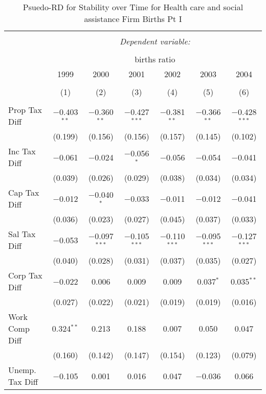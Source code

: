 
\begin{table}[!htbp] \centering 
  \caption{Psuedo-RD for Stability over Time for  Health care and social assistance Firm Births Pt I} 
  \label{62year} 
\small 
\begin{tabular}{@{\extracolsep{5pt}}lcccccc} 
\\[-1.8ex]\hline 
\hline \\[-1.8ex] 
 & \multicolumn{6}{c}{\textit{Dependent variable:}} \\ 
\cline{2-7} 
\\[-1.8ex] & \multicolumn{6}{c}{births ratio} \\ 
 & 1999 & 2000 & 2001 & 2002 & 2003 & 2004 \\ 
\\[-1.8ex] & (1) & (2) & (3) & (4) & (5) & (6)\\ 
\hline \\[-1.8ex] 
 Prop Tax Diff & $-$0.403$^{**}$ & $-$0.360$^{**}$ & $-$0.427$^{***}$ & $-$0.381$^{**}$ & $-$0.366$^{**}$ & $-$0.428$^{***}$ \\ 
  & (0.199) & (0.156) & (0.156) & (0.157) & (0.145) & (0.102) \\ 
  Inc Tax Diff & $-$0.061 & $-$0.024 & $-$0.056$^{*}$ & $-$0.056 & $-$0.054 & $-$0.041 \\ 
  & (0.039) & (0.026) & (0.029) & (0.038) & (0.034) & (0.034) \\ 
  Cap Tax Diff & $-$0.012 & $-$0.040$^{*}$ & $-$0.033 & $-$0.011 & $-$0.012 & $-$0.041 \\ 
  & (0.036) & (0.023) & (0.027) & (0.045) & (0.037) & (0.033) \\ 
  Sal Tax Diff & $-$0.053 & $-$0.097$^{***}$ & $-$0.105$^{***}$ & $-$0.110$^{***}$ & $-$0.095$^{***}$ & $-$0.127$^{***}$ \\ 
  & (0.040) & (0.028) & (0.031) & (0.037) & (0.035) & (0.027) \\ 
  Corp Tax Diff & $-$0.022 & 0.006 & 0.009 & 0.009 & 0.037$^{*}$ & 0.035$^{**}$ \\ 
  & (0.027) & (0.022) & (0.021) & (0.019) & (0.019) & (0.016) \\ 
  Work Comp Diff & 0.324$^{**}$ & 0.213 & 0.188 & 0.007 & 0.050 & 0.047 \\ 
  & (0.160) & (0.142) & (0.147) & (0.154) & (0.123) & (0.079) \\ 
  Unemp. Tax Diff & $-$0.105 & 0.001 & 0.016 & 0.047 & $-$0.036 & 0.066 \\ 

\end{tabular}
\end{table}
